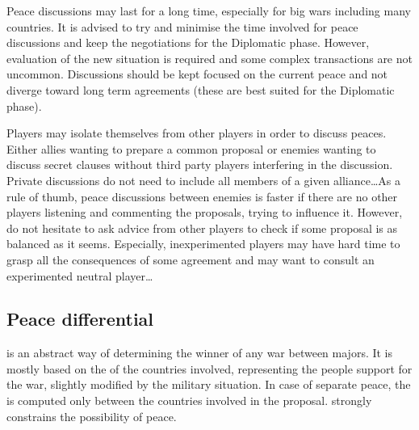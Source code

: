 \begin{playtip}
  Peace discussions may last for a long time, especially for big wars
  including many countries. It is advised to try and minimise the time
  involved for peace discussions and keep the negotiations for the Diplomatic
  phase. However, evaluation of the new situation is required and some complex
  transactions are not uncommon. Discussions should be kept focused on the
  current peace and not diverge toward long term agreements (these are best
  suited for the Diplomatic phase).

  Players may isolate themselves from other players in order to discuss
  peaces. Either allies wanting to prepare a common proposal or enemies
  wanting to discuss secret clauses without third party players interfering in
  the discussion. Private discussions do not need to include all members of a
  given alliance\ldots As a rule of thumb, peace discussions between enemies
  is faster if there are no other players listening and commenting the
  proposals, trying to influence it. However, do not hesitate to ask advice
  from other players to check if some proposal is as balanced as it
  seems. Especially, inexperimented players may have hard time to grasp all
  the consequences of some agreement and may want to consult an experimented
  neutral player\ldots
\end{playtip}



\subsection{Peace differential}
 is an abstract way of determining the
winner of any war between majors. It is mostly based on the \STAB of the
countries involved, representing the people support for the war, slightly
modified by the military situation.
\bparag In case of separate peace, the  is computed
only between the countries involved in the proposal.
\bparag {} strongly constrains the possibility of
peace.

